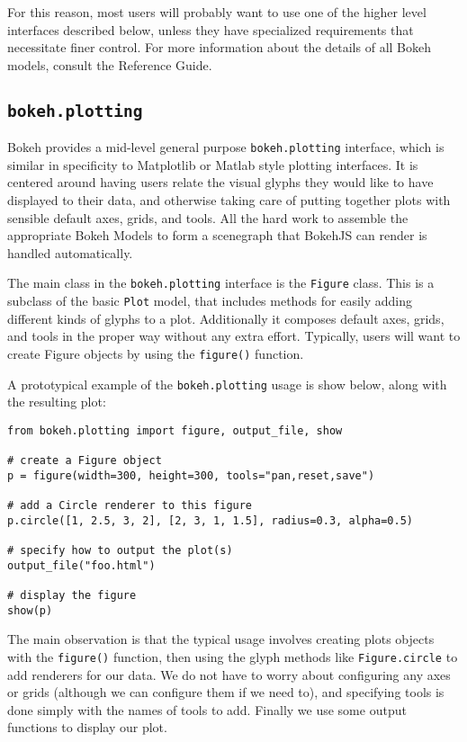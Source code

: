 \documentclass[a4paper,12pt]{article}
\begin{document}
For this reason, most users will probably want to use one of the higher level interfaces described below, unless they have specialized requirements that necessitate finer control. For more information about the details of all Bokeh models, consult the Reference Guide.

\subsection{\texttt{bokeh.plotting}}
Bokeh provides a mid-level general purpose \texttt{bokeh.plotting} interface, which is similar in specificity to Matplotlib or Matlab style plotting interfaces. It is centered around having users relate the visual glyphs they would like to have displayed to their data, and otherwise taking care of putting together plots with sensible default axes, grids, and tools. All the hard work to assemble the appropriate Bokeh Models to form a scenegraph that BokehJS can render is handled automatically.

The main class in the \texttt{bokeh.plotting} interface is the \texttt{Figure} class. This is a subclass of the basic \texttt{Plot} model, that includes methods for easily adding different kinds of glyphs to a plot. Additionally it composes default axes, grids, and tools in the proper way without any extra effort. Typically, users will want to create Figure objects by using the \texttt{figure()} function.

A prototypical example of the \texttt{bokeh.plotting} usage is show below, along with the resulting plot:

\begin{framed}
\begin{verbatim}
from bokeh.plotting import figure, output_file, show

# create a Figure object
p = figure(width=300, height=300, tools="pan,reset,save")

# add a Circle renderer to this figure
p.circle([1, 2.5, 3, 2], [2, 3, 1, 1.5], radius=0.3, alpha=0.5)

# specify how to output the plot(s)
output_file("foo.html")

# display the figure
show(p)
\end{verbatim}
\end{framed}
The main observation is that the typical usage involves creating plots objects with the \texttt{figure()} function, then using the glyph methods like \texttt{Figure.circle} to add renderers for our data. We do not have to worry about configuring any axes or grids (although we can configure them if we need to), and specifying tools is done simply with the names of tools to add. Finally we use some output functions to display our plot.
\end{document}

